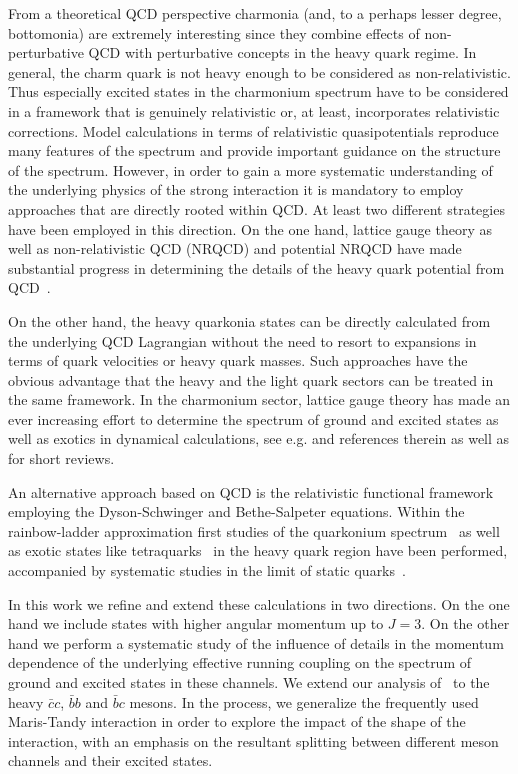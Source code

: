 From a theoretical QCD perspective charmonia (and, to a perhaps lesser 
degree, bottomonia) are extremely interesting since they combine effects 
of non-perturbative QCD with perturbative concepts in the heavy quark 
regime. In general, the charm quark is not heavy enough to be considered 
as non-relativistic. Thus especially excited states in the charmonium spectrum 
have to be considered in a framework that is genuinely relativistic or, 
at least, incorporates relativistic corrections. Model calculations in 
terms of relativistic quasipotentials reproduce many features of the spectrum
\cite{Godfrey:1985xj,Ebert:2002pp,Ebert:2011jc,LlanesEstrada:2011kc} and provide important
guidance on the structure of the spectrum. However, in order to gain a more 
systematic understanding of the underlying physics of the strong 
interaction it is mandatory to employ approaches that are directly rooted 
within QCD. At least two different strategies have been employed in this 
direction. On the one hand, lattice gauge theory as well as non-relativistic 
QCD (NRQCD) and potential NRQCD have made substantial progress in determining 
the details of the heavy quark potential from QCD~\cite{Brambilla:2004jw,Koma:2006si}. 

On the other hand, the heavy quarkonia states can be directly calculated 
from the underlying QCD Lagrangian without the need to resort to expansions 
in terms of quark velocities or heavy quark masses. Such approaches have the
obvious advantage that the heavy and the light quark sectors can be treated 
in the same framework. In the charmonium sector, lattice gauge theory has made 
an ever increasing effort to determine the spectrum of ground and excited states
as well as exotics in dynamical calculations, see e.g. 
\cite{Namekawa:2011wt,Bali:2011rd,Liu:2012ze,Moir:2013ub,Kalinowski:2013wsa}
and references therein as well as \cite{Mohler:2012gn,Prelovsek:2013cta} for short reviews.

An alternative approach based on QCD is the relativistic functional framework 
employing the Dyson-Schwinger and Bethe-Salpeter equations. Within the
rainbow-ladder approximation first studies of the quarkonium 
spectrum~\cite{Bhagwat:2006pu,Blank:2011ha,Hilger:2014nma,Popovici:2014pha} 
as well as exotic states like tetraquarks~\cite{Heupel:2012ua} 
in the heavy quark region have been performed, accompanied by 
systematic studies in the limit of static quarks~\cite{Popovici:2010mb,Popovici:2011yz,Popovici:2014usa}.

In this work we refine and extend these calculations in two directions. On 
the one hand we include states with higher angular momentum up to $J=3$.
On the other hand we perform a systematic study of the influence of 
details in the momentum dependence of the underlying effective running
coupling on the spectrum of ground and excited states in these channels.
We extend our analysis of~\cite{Fischer:2014xha} to the heavy $\bar{c}c$, $\bar{b}b$ 
and $\bar{b}c$ mesons. In the process, we generalize the frequently used Maris-Tandy 
interaction in order to explore the impact of the shape of the interaction, with 
an emphasis on the resultant splitting between different meson channels and their
excited states. 

